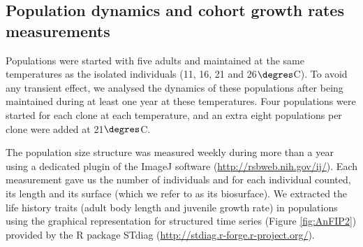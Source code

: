 % 

\subsection{Population dynamics and cohort growth rates measurements}

Populations were started with five adults and maintained at the same
temperatures as the isolated individuals (11, 16, 21 and 26$\degres$C). To avoid
any transient effect, we analysed the dynamics of these populations after being
maintained during at least one year at these temperatures. Four populations were
started for each clone at each temperature, and an extra eight populations per
clone were added at 21$\degres$C.

The population size structure was measured weekly during more than a year using
a dedicated plugin \autocites{mallard2013a,mallard2012a} of the ImageJ software
\autocites{abramoff2004a} (\url{http://rsbweb.nih.gov/ij/}). Each
measurement gave us the number of individuals and for each individual counted, its length and its surface
(which we refer to as its biosurface). We extracted the life history traits
(adult body length and juvenile growth rate) in populations using the graphical
representation for structured time series (Figure \ref{fig:AnFIP2}) provided by
the R package STdiag (\url{http://stdiag.r-forge.r-project.org/}).

